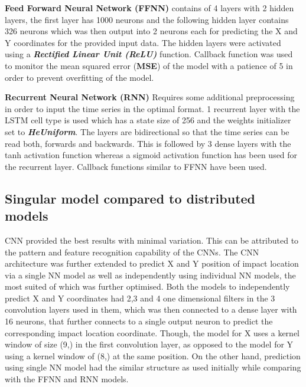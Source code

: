 \documentclass[12pt]{article}
\begin{document}
\par      
\textbf{Feed Forward Neural Network (FFNN)} contains of 4 layers with 2 hidden layers, the first layer has 1000 neurons and the following hidden layer contains 326 neurons which was then output into 2 neurons each for predicting the X and Y coordinates for the provided input data. The hidden layers were activated using a \emph{\textbf{Rectified Linear Unit (ReLU)}} function. Callback function was used to monitor the mean squared error (\textbf{MSE}) of the model with a patience of 5 in order to prevent overfitting of the model.

\par
\textbf{Recurrent  Neural Network (RNN)} 
Requires some additional preprocessing in order to input the time series in the optimal format. 1 recurrent layer with the LSTM cell type is used which has a state size of 256 and the weights initializer set to \emph{\textbf{HeUniform}}. The layers are bidirectional so that the time series can be read both, forwards and backwards. This is followed by 3 dense layers with the tanh activation function whereas a sigmoid activation function has been used for the recurrent layer. Callback functions similar to FFNN have been used.

\par
\subsection{Singular model compared to distributed models}
\par
CNN provided the best results with minimal variation. This can be attributed to the pattern and feature recognition capability of the CNNs. The CNN architecture was further extended to predict X and Y position of impact location via a single NN model as well as independently using individual NN models, the most suited of which was further optimised. Both the models to independently predict X and Y coordinates had 2,3 and 4 one dimensional filters in the 3 convolution layers used in them, which was then connected to a dense layer with 16 neurons, that further connects to a single output neuron to predict the corresponding impact location coordinate. Though, the model for X uses a kernel window of size (9,) in the first convolution layer, as opposed to the model for Y using a kernel window of (8,) at the same position. On the other hand, prediction using single NN model had the similar structure as used initially while comparing with the FFNN and RNN models.
\end{document}
